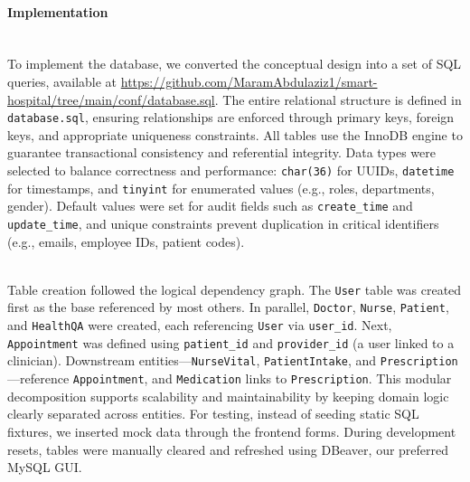\paragraph{Implementation}\mbox{}\\
To implement the database, we converted the conceptual design into a set of SQL queries, available at \url{https://github.com/MaramAbdulaziz1/smart-hospital/tree/main/conf/database.sql}. The entire relational structure is defined in \texttt{database.sql}, ensuring relationships are enforced through primary keys, foreign keys, and appropriate uniqueness constraints. All tables use the InnoDB engine to guarantee transactional consistency and referential integrity. Data types were selected to balance correctness and performance: \texttt{char(36)} for UUIDs, \texttt{datetime} for timestamps, and \texttt{tinyint} for enumerated values (e.g., roles, departments, gender). Default values were set for audit fields such as \texttt{create\_time} and \texttt{update\_time}, and unique constraints prevent duplication in critical identifiers (e.g., emails, employee IDs, patient codes).

\mbox{}\\


Table creation followed the logical dependency graph. The \texttt{User} table was created first as the base referenced by most others. In parallel, \texttt{Doctor}, \texttt{Nurse}, \texttt{Patient}, and \texttt{HealthQA} were created, each referencing \texttt{User} via \texttt{user\_id}. Next, \texttt{Appointment} was defined using \texttt{patient\_id} and \texttt{provider\_id} (a user linked to a clinician). Downstream entities—\texttt{NurseVital}, \texttt{PatientIntake}, and \texttt{Prescription}—reference \texttt{Appointment}, and \texttt{Medication} links to \texttt{Prescription}. This modular decomposition supports scalability and maintainability by keeping domain logic clearly separated across entities. For testing, instead of seeding static SQL fixtures, we inserted mock data through the frontend forms. During development resets, tables were manually cleared and refreshed using DBeaver, our preferred MySQL GUI.
